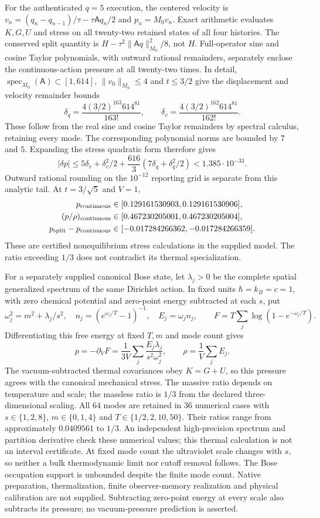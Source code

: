 For the authenticated $q=5$ execution, the centered velocity is
$v_n=(q_n-q_{n-1})/\tau-\tau\mathsf A q_n/2$ and $p_n=M_0v_n$.
Exact arithmetic evaluates $K,G,U$ and stress on all twenty-two retained
states of all four histories. The conserved split quantity is
$H-\tau^2\|\mathsf A q\|_{M_0}^2/8$, not $H$.
Full-operator sine and cosine Taylor polynomials, with outward rational
remainders, separately enclose the continuous-action pressure at all
twenty-two times. In detail, $\operatorname{spec}_{M_0}(\mathsf A)
\subset[1,614]$, $\|v_0\|_{M_0}\le4$ and $t\le3/2$ give the
displacement and velocity remainder bounds
\[
 \delta_q=\frac{4(3/2)^{163}614^{81}}{163!},\qquad
 \delta_v=\frac{4(3/2)^{162}614^{81}}{162!}.
\]
These follow from the real sine and cosine Taylor remainders by spectral
calculus, retaining every mode. The corresponding polynomial norms are
bounded by $7$ and $5$. Expanding the stress quadratic form therefore gives
\[
 |\delta p|\le5\delta_v+\delta_v^2/2
       +\frac{616}{3}(7\delta_q+\delta_q^2/2)<1.385\cdot10^{-33}.
\]
Outward rational rounding on the $10^{-12}$ reporting grid is separate
from this analytic tail. At $t=3/\sqrt5$ and $V=1$,
\begin{align*}
 p_{\rm continuous}&\in[0.129161530903,0.129161530906],\\
 (p/\rho)_{\rm continuous}&\in[0.467230205001,0.467230205004],\\
 p_{\rm split}-p_{\rm continuous}
   &\in[-0.017284266362,-0.017284266359].
\end{align*}
These are certified nonequilibrium stress calculations in the supplied model. The
ratio exceeding $1/3$ does not contradict its thermal specialization.

For a separately supplied canonical Bose state, let $\lambda_j>0$ be
the complete spatial generalized spectrum of the same Dirichlet action.
In fixed units $\hbar=k_B=c=1$, with zero chemical potential and zero-point
energy subtracted at each $s$, put
\[
 \omega_j^2=m^2+\lambda_j/s^2,\quad
 n_j=(e^{\omega_j/T}-1)^{-1},\quad E_j=\omega_jn_j,
 \qquad F=T\sum_j\log(1-e^{-\omega_j/T}).
\]
Differentiating this free energy at fixed $T,m$ and mode count gives
\[
 p=-\partial_VF
  =\frac1{3V}\sum_j\frac{E_j\lambda_j}{s^2\omega_j^2},\qquad
 \rho=\frac1V\sum_jE_j.
\]
The vacuum-subtracted thermal covariances obey $K=G+U$, so this pressure agrees with the
canonical mechanical stress. The massive ratio depends on temperature
and scale; the massless ratio is $1/3$ from the declared three-dimensional
scaling. All $64$ modes are retained in $36$ numerical cases with
$s\in\{1,2,8\}$, $m\in\{0,1,4\}$ and $T\in\{1/2,2,10,50\}$.
Their ratios range from approximately $0.0409561$ to $1/3$.
An independent high-precision spectrum and partition derivative check these
numerical values; this thermal calculation is not an interval certificate.
At fixed mode count the ultraviolet scale changes with $s$, so neither a
bulk thermodynamic limit nor cutoff removal follows. The Bose occupation
support is unbounded despite the finite mode count. Native preparation,
thermalization, finite observer-memory realization and physical calibration
are not supplied. Subtracting zero-point energy at every scale also
subtracts its pressure; no vacuum-pressure prediction is asserted.

